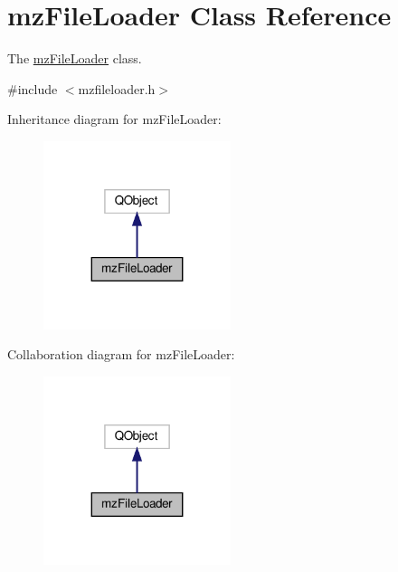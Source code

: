 \hypertarget{classmz_file_loader}{}\section{mz\+File\+Loader Class Reference}
\label{classmz_file_loader}


The \mbox{\hyperlink{classmz_file_loader}{mz\+File\+Loader}} class.  




{\ttfamily \#include $<$mzfileloader.\+h$>$}



Inheritance diagram for mz\+File\+Loader\+:\nopagebreak
\begin{figure}[H]
\begin{center}
\leavevmode
\includegraphics[width=155pt]{classmz_file_loader__inherit__graph}
\end{center}
\end{figure}


Collaboration diagram for mz\+File\+Loader\+:\nopagebreak
\begin{figure}[H]
\begin{center}
\leavevmode
\includegraphics[width=155pt]{classmz_file_loader__coll__graph}
\end{center}
\end{figure}
